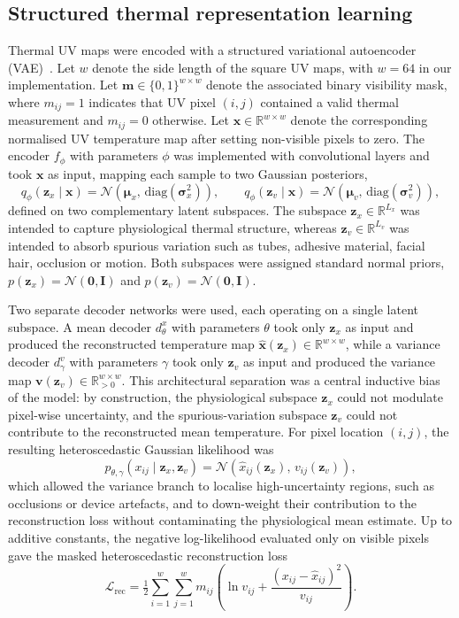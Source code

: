 \documentclass[11pt]{article}
\begin{document}
\subsection*{Structured thermal representation learning}

Thermal UV maps were encoded with a structured variational autoencoder (VAE)~\citep{kingma2013auto}. Let $w$ denote the side length of the square UV maps, with $w=64$ in our implementation. Let $\mathbf{m}\in\{0,1\}^{w\times w}$ denote the associated binary visibility mask, where $m_{ij}=1$ indicates that UV pixel $(i,j)$ contained a valid thermal measurement and $m_{ij}=0$ otherwise. Let $\mathbf{x}\in\mathbb{R}^{w\times w}$ denote the corresponding normalised UV temperature map after setting non-visible pixels to zero. The encoder $f_{\phi}$ with parameters $\phi$ was implemented with convolutional layers and took $\mathbf{x}$ as input, mapping each sample to two Gaussian posteriors,
\[
  q_{\phi}(\mathbf{z}_{x}\mid\mathbf{x}) = \mathcal{N}\!\left(\bm{\mu}_{x},\,\mathrm{diag}(\bm{\sigma}_{x}^{2})\right), \qquad
  q_{\phi}(\mathbf{z}_{v}\mid\mathbf{x}) = \mathcal{N}\!\left(\bm{\mu}_{v},\,\mathrm{diag}(\bm{\sigma}_{v}^{2})\right),
\]
defined on two complementary latent subspaces. The subspace $\mathbf{z}_{x}\in\mathbb{R}^{L_{x}}$ was intended to capture physiological thermal structure, whereas $\mathbf{z}_{v}\in\mathbb{R}^{L_{v}}$ was intended to absorb spurious variation such as tubes, adhesive material, facial hair, occlusion or motion. Both subspaces were assigned standard normal priors, $p(\mathbf{z}_{x})=\mathcal{N}(\mathbf{0},\mathbf{I})$ and $p(\mathbf{z}_{v})=\mathcal{N}(\mathbf{0},\mathbf{I})$.

Two separate decoder networks were used, each operating on a single latent subspace. A mean decoder $d_{\theta}^{x}$ with parameters $\theta$ took only $\mathbf{z}_{x}$ as input and produced the reconstructed temperature map $\hat{\mathbf{x}}(\mathbf{z}_{x})\in\mathbb{R}^{w\times w}$, while a variance decoder $d_{\gamma}^{v}$ with parameters $\gamma$ took only $\mathbf{z}_{v}$ as input and produced the variance map $\mathbf{v}(\mathbf{z}_{v})\in\mathbb{R}_{>0}^{w\times w}$. This architectural separation was a central inductive bias of the model: by construction, the physiological subspace $\mathbf{z}_{x}$ could not modulate pixel-wise uncertainty, and the spurious-variation subspace $\mathbf{z}_{v}$ could not contribute to the reconstructed mean temperature. For pixel location $(i,j)$, the resulting heteroscedastic Gaussian likelihood was
\[
  p_{\theta,\gamma}(x_{ij}\mid\mathbf{z}_{x},\mathbf{z}_{v}) = \mathcal{N}\!\left(\hat{x}_{ij}(\mathbf{z}_{x}),\,v_{ij}(\mathbf{z}_{v})\right),
\]
which allowed the variance branch to localise high-uncertainty regions, such as occlusions or device artefacts, and to down-weight their contribution to the reconstruction loss without contaminating the physiological mean estimate. Up to additive constants, the negative log-likelihood evaluated only on visible pixels gave the masked heteroscedastic reconstruction loss
\[
  \mathcal{L}_{\mathrm{rec}} = \tfrac{1}{2}\sum_{i=1}^{w}\sum_{j=1}^{w} m_{ij}\left(\ln v_{ij} + \frac{(x_{ij}-\hat{x}_{ij})^{2}}{v_{ij}}\right).
\]
\end{document}
